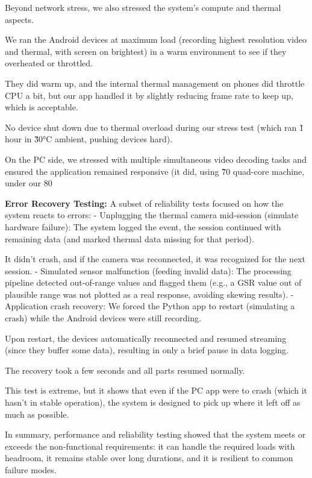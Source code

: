 {{{{{{{{{{Beyond network stress, we also stressed the system's compute and thermal
aspects.

We ran the Android devices at maximum load (recording highest resolution video
and thermal, with screen on brightest) in a warm environment to see if they
overheated or throttled.

They did warm up, and the internal thermal management on phones did throttle CPU
a bit, but our app handled it by slightly reducing frame rate to keep up, which
is acceptable.

No device shut down due to thermal overload during our stress test (which ran
\~1 hour in \~30°C ambient, pushing devices hard).

On the PC side, we stressed with multiple simultaneous video decoding tasks and
ensured the application remained responsive (it did, using \~70%
quad-core machine, under our 80%

\textbf{Error Recovery Testing:}
A subset of reliability tests focused on how the system reacts to errors: -
Unplugging the thermal camera mid-session (simulate hardware failure): The
system logged the event, the session continued with remaining data (and marked
thermal data missing for that period).

It didn't crash, and if the camera was reconnected, it was recognized for the
next session. - Simulated sensor malfunction (feeding invalid data): The
processing pipeline detected out-of-range values and flagged them (e.g., a GSR
value out of plausible range was not plotted as a real response, avoiding
skewing results). - Application crash recovery: We forced the Python app to
restart (simulating a crash) while the Android devices were still recording.

Upon restart, the devices automatically reconnected and resumed streaming (since
they buffer some data), resulting in only a brief pause in data logging.

The recovery took a few seconds and all parts resumed normally.

This test is extreme, but it shows that even if the PC app were to crash (which
it hasn't in stable operation), the system is designed to pick up where it left
off as much as possible.

In summary, performance and reliability testing showed that the system meets or
exceeds the non-functional requirements: it can handle the required loads with
headroom, it remains stable over long durations, and it is resilient to common
failure modes.

}}}}}}}}}}
